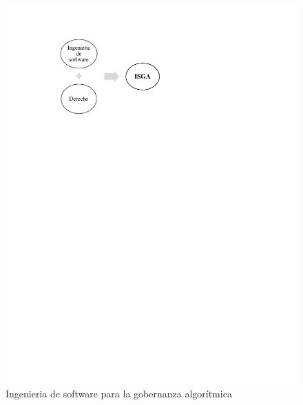 \documentclass[12pt]{report} %
\begin{document}
\begin{figure}
\centering
\includegraphics[width=0.85\columnwidth]{imagenes/pptesis.pdf}
\caption{Ingenieria de software para la gobernanza algorítmica}
\label{circulosfigdesd}
\end{figure} 
\end{document}
